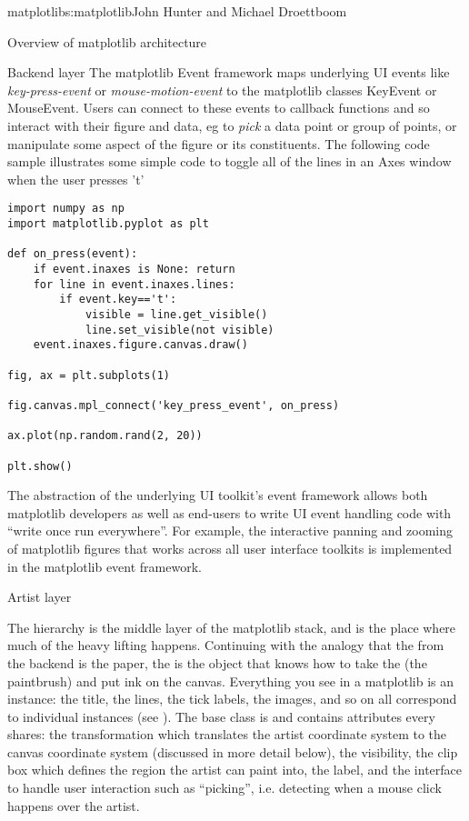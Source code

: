 \begin{aosachapter}{matplotlib}{s:matplotlib}{John Hunter and Michael Droettboom}
\begin{aosasect1}{Overview of matplotlib architecture}
\begin{aosasect2}{Backend layer}
The matplotlib Event framework maps underlying UI events like
\textit{key-press-event} or \textit{mouse-motion-event} to the
matplotlib classes KeyEvent or MouseEvent.  Users can connect to these
events to callback functions and so interact with their figure and
data, eg to \textit{pick} a data point or group of points, or
manipulate some aspect of the figure or its constituents.  The
following code sample illustrates some simple code to toggle all of
the lines in an Axes window when the user presses 't'

\begin{verbatim}
import numpy as np
import matplotlib.pyplot as plt

def on_press(event):
    if event.inaxes is None: return
    for line in event.inaxes.lines:
        if event.key=='t':
            visible = line.get_visible()
            line.set_visible(not visible)
    event.inaxes.figure.canvas.draw()

fig, ax = plt.subplots(1)

fig.canvas.mpl_connect('key_press_event', on_press)

ax.plot(np.random.rand(2, 20))

plt.show()
\end{verbatim}

The abstraction of the underlying UI toolkit's event framework allows
both matplotlib developers as well as end-users to write UI event
handling code with ``write once run everywhere''.  For example, the
interactive panning and zooming of matplotlib figures that works
across all user interface toolkits is implemented in the matplotlib
event framework.

\end{aosasect2}

\begin{aosasect2}{Artist layer}

The  hierarchy is the middle layer of the matplotlib
stack, and is the place where much of the heavy lifting happens.
Continuing with the analogy that the  from the
backend is the paper, the  is the object that knows how
to take the  (the paintbrush) and put ink on the
canvas.  Everything you see in a matplotlib  is an
 instance: the title, the lines, the tick labels, the
images, and so on all correspond to individual  instances
(see ).  The base class is
 and contains attributes every
 shares: the transformation which translates the artist
coordinate system to the canvas coordinate system (discussed in more
detail below), the visibility, the clip box which defines the region
the artist can paint into, the label, and the interface to handle user
interaction such as ``picking'', i.e. detecting when a mouse click
happens over the artist.


\end{aosasect2}
\end{aosasect1}
\end{aosachapter}
